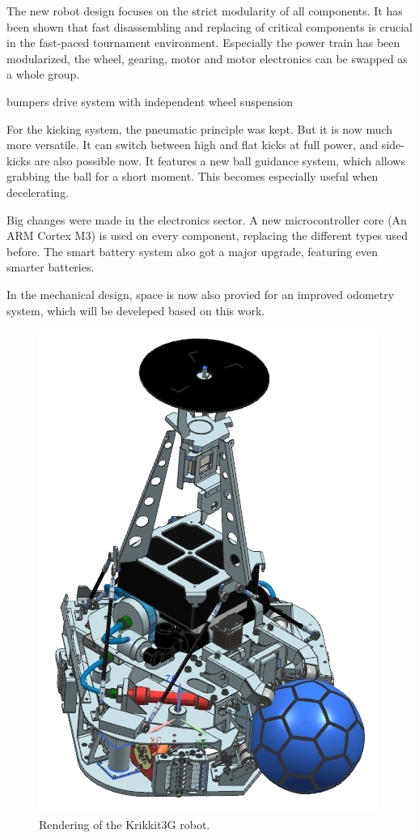 \documentclass[12pt,a4paper]{article}
\begin{document}
The new robot design focuses on the strict modularity of all components.
It has been shown that fast disassembling and replacing of critical components is crucial in the fast-paced tournament environment.
Especially the power train has been modularized, the wheel, gearing, motor and motor electronics can be swapped as a whole group.



  bumpers 
  drive system with  independent wheel suspension 

For the kicking system, the pneumatic principle was kept.
But it is now much more versatile. 
It can switch between high and flat kicks at full power, and side-kicks are also possible now.
It features a new ball guidance system, which allows grabbing the ball for a short moment.
This becomes especially useful when decelerating.

Big changes were made in the electronics sector.
A new microcontroller core (An ARM Cortex M3) is used on every component, replacing the different types used before.
The smart battery system also got a major upgrade, featuring even smarter batteries.

In the mechanical design, space is now also provied for an improved odometry system, which will be develeped based on this work.


\begin{figure}[ht]
\begin{center}  
\includegraphics[width=0.5\columnwidth]{figures/Krikkit3G.jpg}
\caption{\label{fig:krikkit3g}
Rendering of the Krikkit3G robot.
}   
\end{center}
\end{figure}
\end{document}
